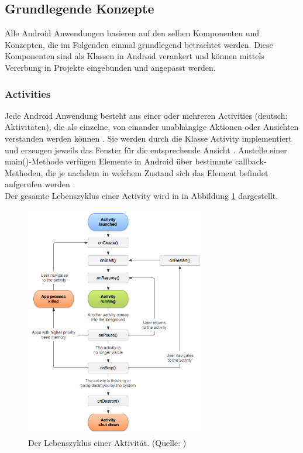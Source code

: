 \subsection{Grundlegende Konzepte}
Alle Android Anwendungen basieren auf den selben Komponenten und Konzepten, die im Folgenden einmal grundlegend betrachtet werden. Diese Komponenten sind als Klassen in Android verankert und können mittels Vererbung in Projekte eingebunden und angepasst werden.

\subsubsection{Activities}
Jede Android Anwendung besteht aus einer oder mehreren Activities (deutsch: \glqq Aktivitäten\grqq ), die als einzelne, von einander unabhängige Aktionen oder Ansichten verstanden werden können \citep{android:activities}.
Sie werden durch die Klasse Activity implementiert und erzeugen jeweils das Fenster für die entsprechende Ansicht \citep{android:activities}. Anstelle einer main()-Methode verfügen Elemente in Android über bestimmte callback-Methoden, die je nachdem in welchem Zustand sich das Element befindet aufgerufen werden \citep{android:activities}.\\
Der gesamte Lebenszyklus einer Activity wird in in Abbildung \ref{fig:activity-lifecycle} dargestellt. 
\begin{figure}[h!]
\centering
\includegraphics[width=0.7\textwidth]{Abbildungen/activity-lifecycle.png}
\caption[Android: Lebenszyklus einer Aktivität]{Der Lebenszyklus einer Aktivität. (Quelle: \citet{android:activity-lifecycle})}
\label{fig:activity-lifecycle}
\end{figure}

